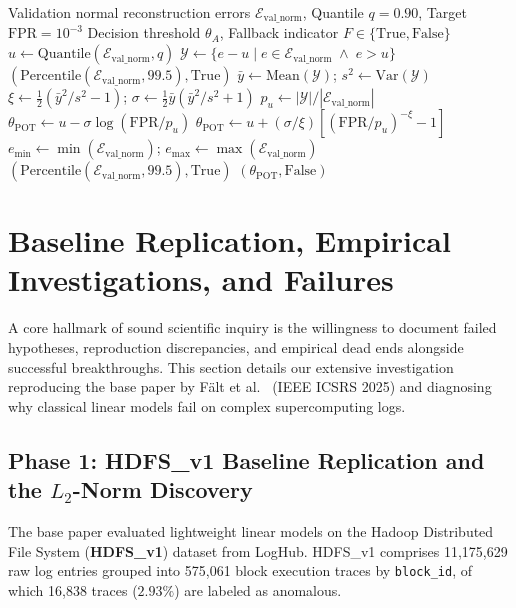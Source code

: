 \begin{algorithm}[H]
\caption{Label-Free Extreme Value Theory (POT) Thresholding with Safeguard}
\label{alg:pot_thresholding}
\begin{algorithmic}[1]
\Require Validation normal reconstruction errors $\mathcal{E}_{\text{val\_norm}}$, Quantile $q=0.90$, Target $\text{FPR}=10^{-3}$
\Ensure Decision threshold $\theta_A$, Fallback indicator $F \in \{\text{True}, \text{False}\}$
\State $u \gets \text{Quantile}(\mathcal{E}_{\text{val\_norm}}, q)$
\State $\mathcal{Y} \gets \{ e - u \mid e \in \mathcal{E}_{\text{val\_norm}} \;\land\; e > u \}$
    \State \Return $(\text{Percentile}(\mathcal{E}_{\text{val\_norm}}, 99.5), \text{True})$
\EndIf
\State $\bar{y} \gets \text{Mean}(\mathcal{Y})$; $s^2 \gets \text{Var}(\mathcal{Y})$
\State $\xi \gets \frac{1}{2}( \bar{y}^2 / s^2 - 1 )$; $\sigma \gets \frac{1}{2}\bar{y}( \bar{y}^2 / s^2 + 1 )$
\State $p_u \gets |\mathcal{Y}| / |\mathcal{E}_{\text{val\_norm}}|$
    \State $\theta_{\text{POT}} \gets u - \sigma \log(\text{FPR} / p_u)$
\Else
    \State $\theta_{\text{POT}} \gets u + (\sigma / \xi) [ (\text{FPR} / p_u)^{-\xi} - 1 ]$
\EndIf
\State $e_{\min} \gets \min(\mathcal{E}_{\text{val\_norm}})$; $e_{\max} \gets \max(\mathcal{E}_{\text{val\_norm}})$
    \State \Return $(\text{Percentile}(\mathcal{E}_{\text{val\_norm}}, 99.5), \text{True})$
\Else
    \State \Return $(\theta_{\text{POT}}, \text{False})$
\EndIf
\end{algorithmic}
\end{algorithm}

\section{Baseline Replication, Empirical Investigations, and Failures}
\label{sec:arch_reproduction_log}
A core hallmark of sound scientific inquiry is the willingness to document failed hypotheses, reproduction discrepancies, and empirical dead ends alongside successful breakthroughs. This section details our extensive investigation reproducing the base paper by F{\"a}lt et al.~\cite{falt2025lightweight} (IEEE ICSRS 2025) and diagnosing why classical linear models fail on complex supercomputing logs.

\subsection{Phase 1: HDFS\_v1 Baseline Replication and the $L_2$-Norm Discovery}
\label{subsec:hdfs_replication}
The base paper evaluated lightweight linear models on the Hadoop Distributed File System (\textbf{HDFS\_v1}) dataset from LogHub. HDFS\_v1 comprises 11,175,629 raw log entries grouped into 575,061 block execution traces by \texttt{block\_id}, of which 16,838 traces ($2.93\%$) are labeled as anomalous. 

